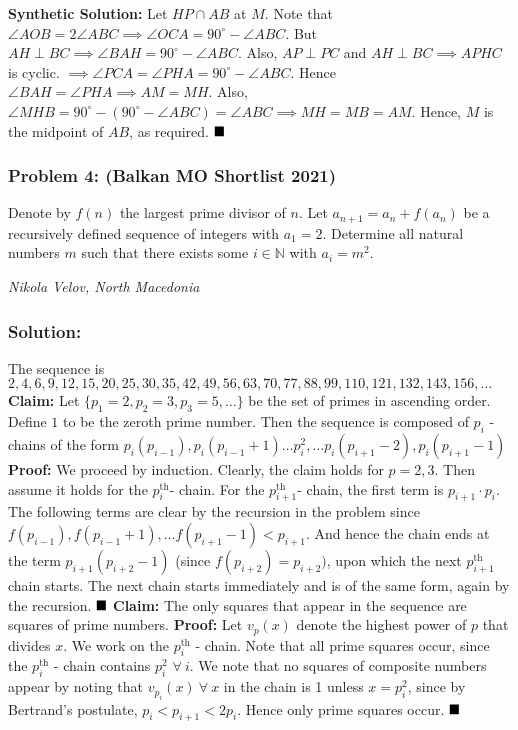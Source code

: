 \documentclass[fontsize=9pt]{scrartcl}
\begin{document}
\textbf{Synthetic Solution:} \newline
Let $HP \cap AB $ at $M$. \newline
Note that $\angle AOB = 2 \angle ABC \implies \angle OCA = 90^{\circ} - \angle ABC$. But $AH \perp BC \implies \angle BAH = 90^{\circ}-\angle ABC$.
Also, $AP \perp PC$ and $AH \perp BC \implies APHC$ is cyclic. $\implies \angle PCA = \angle PHA = 90^{\circ} - \angle ABC$.
Hence $\angle BAH = \angle PHA \implies AM=MH$. Also, $\angle MHB = 90^{\circ} - (90^{\circ} - \angle ABC) = \angle ABC \implies MH = MB = AM$.
Hence, $M$ is the midpoint of $AB$, as required. $\hfill \blacksquare$

\subsubsection*{Problem 4: (Balkan MO Shortlist 2021)}
Denote by $f(n)$ the largest prime divisor of $n$. Let $a_{n+1} = a_n + f(a_n)$ be a recursively
defined sequence of integers with $a_1 = 2$. Determine all natural numbers $m$ such that there
exists some $i \in \mathbb{N}$ with $a_i = m^2$. \begin{flushright}
    \emph{Nikola Velov, North Macedonia}
\end{flushright}
\subsubsection*{Solution:}
The sequence is $2, 4, 6, 9, 12, 15, 20, 25, 30, 35, 42, 49, 56, 63, 70, 77, 88, 99, 110, 121, 132, 143, 156, \dots$ \newline \newline
\textbf{Claim:} Let $\{p_1 = 2, p_2 = 3, p_3 = 5, \dots \}$ be the set of primes in ascending order. Define $1$ to be the zeroth prime number.
Then the sequence is composed of $p_i$ - chains of the form $p_i(p_{i-1}), p_i(p_{i-1} + 1) \dots p_i^2, \dots p_i(p_{i+1} - 2), p_i(p_{i+1} -1)$
\newline
\textbf{Proof:} We proceed by induction. Clearly, the claim holds for $p=2, 3$. Then assume it holds 
for the $p_i^{\text{th}}$- chain. For the $p_{i+1}^{\text{th}}$- chain, the first term is $p_{i+1} \cdot p_i$. The following terms are clear
by the recursion in the problem since $f(p_{i-1}), f(p_{i-1}+1), \dots f(p_{i+1}-1) < p_{i+1}$. And hence the chain ends
at the term $p_{i+1} (p_{i+2} - 1)$ (since $ f(p_{i+2}) = p_{i+2})$, upon which the next $p_{i+1}^{\text{th}}$ chain starts.
The next chain starts immediately and is of the same form, again by the recursion. $ \hfill \blacksquare$
\newline \newline
\textbf{Claim:} The only squares that appear in the sequence are squares of prime numbers. \newline
\textbf{Proof:} Let $v_p(x)$ denote the highest power of $p$ that divides $x$. We work on the $p_i^{\text{th}}$ - chain. Note that all prime squares occur, since the 
$p_{i}^{\text{th}}$ - chain contains $p_i^2$ $\forall \ i$. We note that no squares of composite numbers appear by noting that 
$v_{p_{i}}(x) \ \forall  \ x$ in the chain is 1 unless $x = p_i^2$, since by Bertrand's postulate, $p_i < p_{i+1} < 2p_i$. Hence only prime squares occur. $\hfill \blacksquare$
\end{document}
